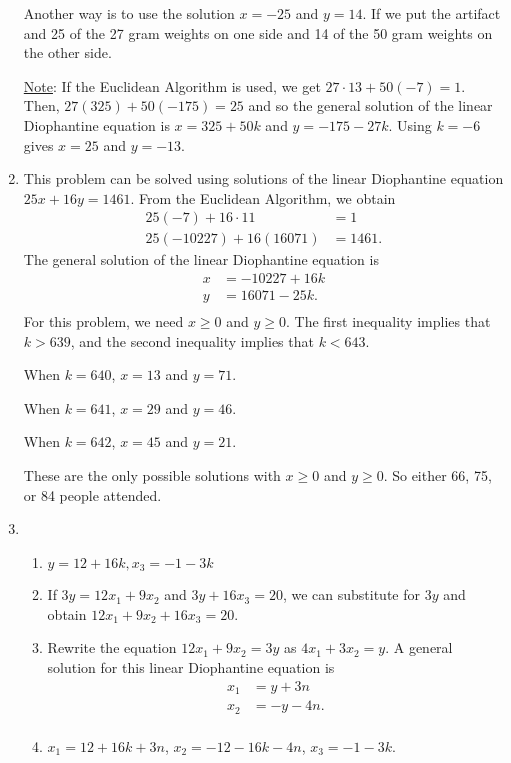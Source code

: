 \begin{enumerate}
Another way is to use the solution $x = -25$ and $y = 14$.  If we put the artifact and 25 of the 27 gram weights on one side and 14 of the 50 gram weights on the other side.

\underline{Note}:  If the Euclidean Algorithm is used, we get $27 \cdot 13 + 50 \left( -7 \right) = 1$.  Then, 
$27 \left( 325 \right) + 50 \left( -175 \right) = 25$ and so the general solution of the linear Diophantine equation is $x = 325 + 50k$ and $y = -175 - 27k$.  Using $k = -6$ gives $x = 25$ and 
$y = -13$.

\item This problem can be solved using solutions of the linear Diophantine equation 
$25x + 16y = 1461$.  From the Euclidean Algorithm, we obtain
\[
\begin{aligned}
25 \left( -7 \right) + 16 \cdot 11 &= 1 \\
25 \left( -10227 \right) + 16 \left( 16071 \right) &= 1461. 
\end{aligned}
\]
The general solution of the linear Diophantine equation is
\[
\begin{aligned}
x &= -10227 + 16k \\
y &= 16071 - 25k. \\
\end{aligned}
\]
For this problem, we need $x \geq 0$ and $y \geq 0$.  The first inequality implies that 
$k > 639$, and the second inequality implies that $k < 643$.

\begin{multicols}{2}
When $k = 640$, $x = 13$ and $y = 71$.

When $k = 641$, $x = 29$ and $y = 46$.

When $k = 642$, $x = 45$ and $y = 21$.
\end{multicols}

These are the only possible solutions with $x \geq 0$ and $y \geq 0$.  So either 66, 75, or 84 people attended.

\item \begin{enumerate}
\item $y = 12 + 16k, x_3 = -1 - 3k$

\item If $3y = 12x_1 + 9x_2$ and $3y + 16x_3 = 20$, we can substitute for $3y$ and obtain 
$12x_1 + 9x_2 + 16x_3 = 20$.

\item Rewrite the equation $12x_1 + 9x_2 = 3y$ as $4x_1 + 3x_2 = y$.  A general solution for this linear Diophantine equation is
\[
\begin{aligned}
x_1 &= y + 3n \\
x_2 &= -y - 4n. \\
\end{aligned}
\]
\item $x_1 = 12 + 16k + 3n$, $x_2 = -12 - 16k - 4n$, $x_3 = -1 - 3k$.


\end{enumerate}
\end{enumerate}
